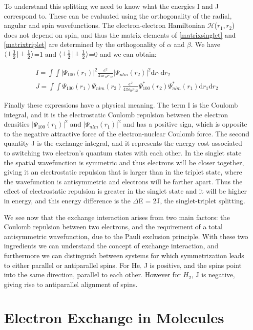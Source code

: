To understand this splitting we need to know what the energies I and J correspond to. These can be evaluated using the orthogonality of the radial, angular and spin wavefunctions. The electron-electron Hamiltonian $\mathscr{H}$($r_1,r_2$) does not depend on spin, and thus the matrix elements of \ref{matrixsinglet} and \ref{matrixtriplet} are determined by the orthogonality of $\alpha$ and $\beta$. We have $\braket{\pm\frac{1}{2}|\pm\frac{1}{2}}$=1 and $\braket{\pm\frac{1}{2}|\pm\frac{1}{2}}$=0 and we can obtain:

\begin{eqnarray}
I = \int\int |\Psi_{100}(r_1)|^2\frac{e^2}{4\pi\epsilon_0 r_{12}}|\Psi_{nlm}(r_2)|^2\text{d}r_1\text{d}r_2 \\
J=\int\int\Psi_{100}(r_1)\Psi_{nlm}(r_2)\frac{e^2}{4\pi\epsilon_0r_{12}}\Psi_{100}^*(r_2)\Psi_{nlm}^*(r_1)\text{d}r_1\text{d}r_2
\end{eqnarray}

Finally these expressions have a physical meaning. The term I is the Coulomb integral, and it is the electrostatic Coulomb repulsion between the electron densities $|\Psi_{100}(r_1)|^2$ and $|\Psi_{nlm}(r_1)|^2$ and has a positive sign, which is opposite to the negative attractive force of the electron-nuclear Coulomb force. The second quantity J is the exchange integral, and it represents the energy cost associated to switching two electron's quantum states with each other. In the singlet state the spatial wavefunction is symmetric and thus electrons will be closer together, giving it an electrostatic repulsion that is larger than in the triplet state, where the wavefunction is antisymmetric and electrons will be farther apart. Thus the effect of electrostatic repulsion is greater in the singlet state and it will be higher in energy, and this energy difference is the $\Delta$E = 2J, the singlet-triplet splitting.

We see now that the exchange interaction arises from two main factors: the Coulomb repulsion between two electrons, and the requirement of a total antisymmetric wavefunction, due to the Pauli exclusion principle. With these two ingredients we can understand the concept of exchange interaction, and furthermore we can distinguish between systems for which symmetrization leads to either parallel or antiparallel spins. For He, J is positive, and the spins point into the same direction, parallel to each other. However for $H_2$, J is negative, giving rise to antiparallel alignment of spins.

\section{Electron Exchange in Molecules}

